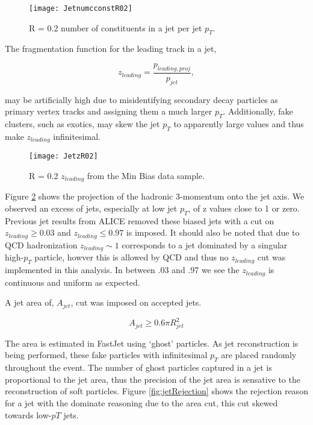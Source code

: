 \begin{figure}[h]
\texttt{[image: JetnumcconstR02]}
\centering
\caption{R = 0.2 number of constituents in a jet per jet $p_{T}$.}
\label{fig:JetConst}
\end{figure}



The fragmentation function for the leading track in a jet,

\begin{equation}
z_{leading} = \frac{ p_{leading, proj} }{ p_{jet} },
\label{eq:zleading}
\end{equation}

\noindent
may be artificially high due to misidentifying secondary decay particles as primary vertex tracks and assigning them a much larger $p_{T}$.  Additionally, fake clusters, such as exotics, may skew the jet $p_{T}$ to apparently large values and thus make $z_{leading}$ infinitesimal.  

\begin{figure}[h]
\texttt{[image: JetzR02]}
\centering
\caption{R = 0.2 $z_{leading}$ from the Min Bias data sample.}
\label{fig:Jetz}
\end{figure}

Figure \ref{fig:Jetz} shows the projection of the hadronic 3-momentum onto the jet axis.  We observed an excess of jets, especially at low jet $p_{T}$, of z values close to 1 or zero.  Previous jet results from ALICE removed these biased jets with a cut on $ z_{leading} \geq 0.03$ and $z_{leading} \leq 0.97$ is imposed.  It should also be noted that due to QCD hadronization $z_{leading} \sim 1$ corresponds to a jet dominated by a singular high-$p_{T}$ particle, howver this is allowed by QCD and thus no $z_{leading}$ cut was implemented in this analysis.  In between .03 and .97 we see the $z_{leading}$ is continuous and uniform as expected.  

A jet area of, $A_{jet}$, cut was imposed on accepted jets.

\begin{equation}
A_{jet} \geq 0.6 \pi R_{jet}^{2}
\label{eq:AreaJet}
\end{equation}

The area is estimated in FastJet using `ghost' particles.  As jet reconstruction is being performed, these fake particles with infinitesimal $p_{T}$ are placed randomly throughout the event.  The number of ghost particles captured in a jet is proportional to the jet area, thus the precision of the jet area is sensative to the reconstruction of soft particles.  Figure \ref{fig:jetRejection} shows the rejection reason for a jet with the dominate reasoning due to the area cut, this cut skewed towards low-$p{T}$ jets.

